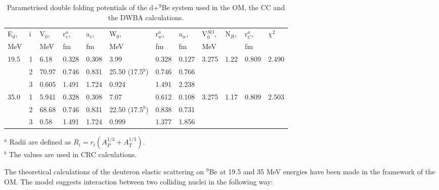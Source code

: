 \documentclass[10pt]{iopart}
\begin{document}
\begin{table}[bp]
\footnotesize
\caption{\label{potpar}  Parametrised double folding potentials of the d+$^9$Be system used in the OM, the CC and the DWBA calculations.}
\begin{tabular*}{\textwidth}{ll@{\extracolsep{\fill}}llllllllll}
\toprule
E$_d$, & i & V$_0$, & r$_v^{a}$, & a$_v$, & W$_0$, & r$_w^{a}$, & a$_w$, & V$_0^{SO}$, & N$_R$, & r$_C^{a}$, & $\chi^2$ \\
MeV   &   & MeV   & fm    & fm    & MeV   & fm    & fm    & MeV        &       & fm   						& \\ \midrule
19.5  & 1 & 6.18  & 0.328 & 0.308 & 3.99  & 0.328 & 0.127 & 3.275      & 1.22  & 0.809 			& 	2.490	\\
      & 2 & 70.97 & 0.746 & 0.831 & 25.50 (17.5$^{b}$) & 0.746 & 0.766 &            &       &    						&   \\
      & 3 & 0.605 & 1.491 & 1.724 & 0.924 & 1.491 & 2.238 &            &       &   							&    \\ \midrule
35.0  & 1 & 5.941 & 0.328 & 0.308 & 7.07  & 0.612 & 0.108 & 3.275      & 1.17  & 0.809 			&	2.503\\
      & 2 & 68.68 & 0.746 & 0.831 & 22.50 (17.5$^{b}$)& 0.838 & 0.731 &            &       &       						&\\
      & 3 & 0.58  & 1.491 & 1.724 & 0.999 & 1.377 & 1.856 &            &       &      							& \\ \bottomrule
\end{tabular*}
\scriptsize
$^{a}$ Radii are defined as $R_i = r_i \left( A^{1/3}_P+A^{1/3}_T \right)$.  \\
$^{b}$ The values are used in CRC calculations. \\
\end{table}



The theoretical calculations  of the deuteron  elastic scattering  on  ${}^9$Be  at 19.5 and 35 MeV energies have been made in the framework of the OM. The model suggests interaction between two colliding nuclei in the following way:
\end{document}
